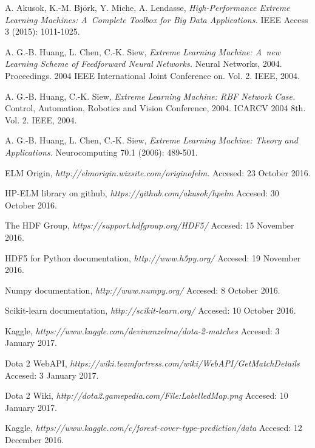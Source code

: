 \documentclass[pl]{minipw} %
\begin{document}

\begin{thebibliography}{20}%

  A. Akusok, K.-M. Björk, Y. Miche, A. Lendasse,
  \emph{High-Performance Extreme Learning Machines: A~Complete Toolbox for Big Data Applications.}
  IEEE Access 3 (2015): 1011-1025.

  A. G.-B. Huang, L. Chen, C.-K. Siew, 
  \emph{Extreme Learning Machine: A~new Learning Scheme of Feedforward Neural Networks.}
   Neural Networks, 2004. Proceedings. 2004 IEEE International Joint Conference on. Vol. 2. IEEE, 2004.

  A. G.-B. Huang, C.-K. Siew, 
  \emph{Extreme Learning Machine: RBF Network Case.} 
  Control, Automation, Robotics and Vision Conference, 2004. ICARCV 2004 8th. Vol. 2. IEEE, 2004.

  A. G.-B. Huang, L. Chen, C.-K. Siew, 
  \emph{Extreme Learning Machine: Theory and Applications.} 
  Neurocomputing 70.1 (2006): 489-501.
  
  ELM Origin,
  \emph{http://elmorigin.wixsite.com/originofelm.}
  Accesed: 23 October 2016.
  
  HP-ELM library on github,
  \emph{https://github.com/akusok/hpelm}
   Accesed: 30 October 2016.

  
  The HDF Group,
  \emph{https://support.hdfgroup.org/HDF5/} 
  Accesed: 15 November 2016.
 
  
  HDF5 for Python documentation,
  \emph{http://www.h5py.org/}
  Accesed: 19 November 2016.

  Numpy documentation,
  \emph{http://www.numpy.org/}
  Accesed: 8 October 2016.  
  
  Scikit-learn documentation,
  \emph{http://scikit-learn.org/}  
  Accesed: 10 October 2016.
  
  Kaggle,
  \emph{https://www.kaggle.com/devinanzelmo/dota-2-matches}
  Accesed: 3 January 2017.
  
  Dota 2 WebAPI,
  \emph{https://wiki.teamfortress.com/wiki/WebAPI/GetMatchDetails}
  Accesed: 3 January 2017.
  
  Dota 2 Wiki,
  \emph{http://dota2.gamepedia.com/File:Labelled\textunderscore Map.png}
  Accesed: 10 January 2017.

  Kaggle,
  \emph{https://www.kaggle.com/c/forest-cover-type-prediction/data}
  Accesed: 12 December 2016.

\end{thebibliography}
\end{document}
